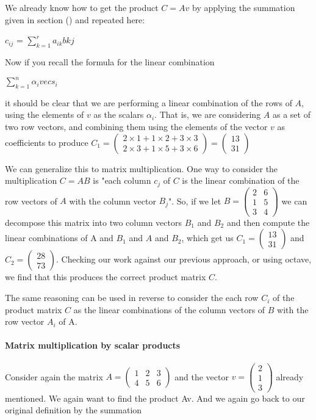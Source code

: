 \documentclass[12pt,letterpaper,final]{article}
\begin{document}
We already know how to get the product $C = Av$ by applying the summation given in section () and repeated here:

$c_{ij}$ = $\sum_{k=1}^{r} a_{ik}b{kj}$

Now if you recall the formula for the linear combination 

$\sum_{k=1}^{n} \alpha_{i}vecs_{i}$

it should be clear that we are performing a linear combination of the rows of $A$, using the elements of $v$ as the scalars $\alpha_i$. That is, we are considering $A$ as a set of two row vectors, and combining them using the elements of the vector $v$ as coefficients to produce $ C_1=\begin{pmatrix}
  2\times 1 + 1\times 2 + 3\times 3 \\ 2 \times 3 + 1 \times 5 + 3 \times 6  
 \end{pmatrix}
=\begin{pmatrix}
13 \\31  
 \end{pmatrix}
$ 

We can generalize this to matrix multiplication. One way to consider the multiplication $C = AB$ is "each column $c_{j}$ of $C$ is the linear combination of the row vectors of $A$ with the column vector $B_j$". So, if we let $ B=\begin{pmatrix}
  2 & 6\\ 1 & 5 \\3  &4 
 \end{pmatrix}
$  we can decompose this matrix into two column vectors $B_1$ and $B_2$ and then compute the  linear combinations of A and $B_1$ and $A$ and $B_2$, which get us $ C_1=\begin{pmatrix}
  13 \\ 31 
 \end{pmatrix}
$  and $ C_2=\begin{pmatrix}
  28 \\73 
 \end{pmatrix}
$. Checking our work against our previous approach, or using octave, we find that this produces the correct product matrix $C$. 

The same reasoning can be used in reverse to consider the each row $C_i$ of the product matrix $C$ as the linear combinations of the column vectors of $B$ with the row vector $A_i$ of A. 

\paragraph{Matrix multiplication by scalar products} Consider again the matrix  $A=\begin{pmatrix}
  1 & 2 & 3 \\ 4 & 5 & 6
 \end{pmatrix}
$ 
and the vector  $ v=\begin{pmatrix}
  2 \\ 1 \\3 
 \end{pmatrix}
$ already mentioned. We again want to find the product Av. And we again go back to our original definition by the summation 
\end{document}
